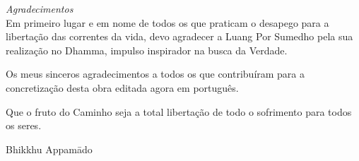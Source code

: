 \cleartorecto
\thispagestyle{empty}

\begin{quotepage}{80mm}
\centering
\textit{Agradecimentos}\\[0.4\baselineskip]
Em primeiro lugar e em nome de todos os que praticam o desapego para a
libertação das correntes da vida, devo agradecer a Luang Por Sumedho
pela sua realização no Dhamma, impulso inspirador na busca da Verdade.

Os meus sinceros agradecimentos a todos os que contribuíram para a
concretização desta obra editada agora em português.

Que o fruto do Caminho seja a total libertação de todo o sofrimento para
todos os seres.

Bhikkhu Appamādo
\end{quotepage}

